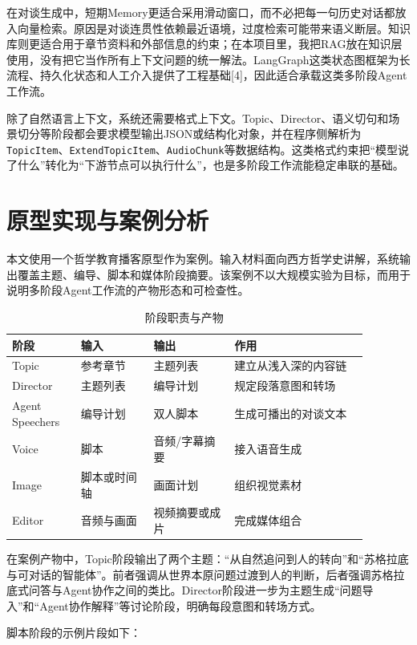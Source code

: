\documentclass{rjthesis}
\begin{document}
在对谈生成中，短期Memory更适合采用滑动窗口，而不必把每一句历史对话都放入向量检索。原因是对谈连贯性依赖最近语境，过度检索可能带来语义断层。知识库则更适合用于章节资料和外部信息的约束；在本项目里，我把RAG放在知识层使用，没有把它当作所有上下文问题的统一解法。LangGraph这类状态图框架为长流程、持久化状态和人工介入提供了工程基础[4]，因此适合承载这类多阶段Agent工作流。

除了自然语言上下文，系统还需要格式上下文。Topic、Director、语义切句和场景切分等阶段都会要求模型输出JSON或结构化对象，并在程序侧解析为\texttt{TopicItem}、\texttt{ExtendTopicItem}、\texttt{AudioChunk}等数据结构。这类格式约束把“模型说了什么”转化为“下游节点可以执行什么”，也是多阶段工作流能稳定串联的基础。

\section{原型实现与案例分析}

本文使用一个哲学教育播客原型作为案例。输入材料面向西方哲学史讲解，系统输出覆盖主题、编导、脚本和媒体阶段摘要。该案例不以大规模实验为目标，而用于说明多阶段Agent工作流的产物形态和可检查性。

\begin{table}[htbp]
\centering
\caption{阶段职责与产物}
\begin{tabular}{p{0.17\linewidth}p{0.18\linewidth}p{0.2\linewidth}p{0.33\linewidth}}
\toprule
阶段 & 输入 & 输出 & 作用\\
\midrule
Topic & 参考章节 & 主题列表 & 建立从浅入深的内容链\\
Director & 主题列表 & 编导计划 & 规定段落意图和转场\\
Agent Speechers & 编导计划 & 双人脚本 & 生成可播出的对谈文本\\
Voice & 脚本 & 音频/字幕摘要 & 接入语音生成\\
Image & 脚本或时间轴 & 画面计划 & 组织视觉素材\\
Editor & 音频与画面 & 视频摘要或成片 & 完成媒体组合\\
\bottomrule
\end{tabular}
\end{table}

在案例产物中，Topic阶段输出了两个主题：“从自然追问到人的转向”和“苏格拉底与可对话的智能体”。前者强调从世界本原问题过渡到人的判断，后者强调苏格拉底式问答与Agent协作之间的类比。Director阶段进一步为主题生成“问题导入”和“Agent协作解释”等讨论阶段，明确每段意图和转场方式。

脚本阶段的示例片段如下：
\end{document}
